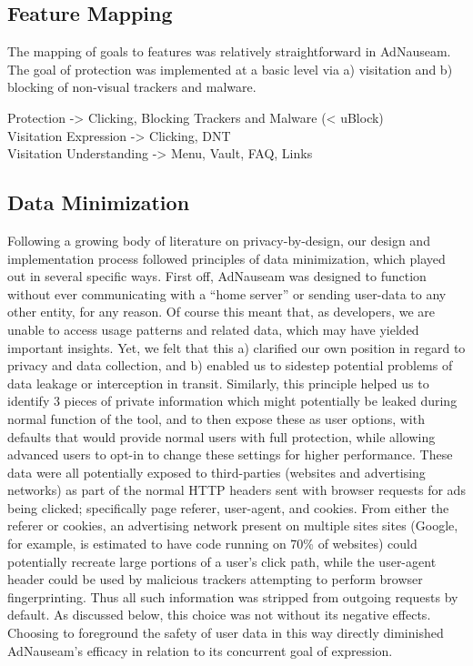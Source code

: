 \documentclass[conference]{IEEEtran}
\begin{document}
\subsection{Feature Mapping}

The mapping of goals to features was relatively straightforward in AdNauseam. The goal of protection was implemented at a basic level via a) visitation and b) blocking of non-visual trackers and malware.

Protection -> Clicking, Blocking Trackers and Malware (< uBlock)\\ Visitation
Expression -> Clicking, DNT\\  Visitation
Understanding -> Menu, Vault, FAQ, Links\\

\subsection{Data Minimization}

Following a growing body of literature on privacy-by-design\cite{Gurses-0, Hoepman, Gurses-1, Hansen, Cavoukian}, our design and implementation process followed principles of data minimization, which played out in several specific ways. First off, AdNauseam was designed to function without ever communicating with a ``home server'' or sending user-data to any other entity, for any reason. Of course this meant that, as developers, we are unable to access usage patterns and related data, which may have yielded important insights. Yet, we felt that this a) clarified our own position in regard to privacy and data collection, and b) enabled us to sidestep potential problems of data leakage or interception in transit. Similarly, this principle helped us to identify 3 pieces of private information which might potentially be leaked during normal function of the tool, and to then expose these as user options, with defaults that would provide normal users with full protection, while allowing advanced users to opt-in to change these settings for higher performance. These data were all potentially exposed to third-parties (websites and advertising networks) as part of the normal HTTP headers sent with browser requests for ads being clicked; specifically page referer, user-agent, and cookies. From either the referer or cookies, an advertising network present on multiple sites sites (Google, for example, is estimated to have code running on 70\% of websites\cite{Englehardt}) could potentially recreate large portions of a user's click path, while the user-agent header could be used by malicious trackers attempting to perform browser fingerprinting\cite{Nikiforakis}. Thus all such information was stripped from outgoing requests by default. As discussed below, this choice was not without its negative effects. Choosing to foreground the safety of user data in this way directly diminished AdNauseam's efficacy in relation to its concurrent goal of expression.
\end{document}
